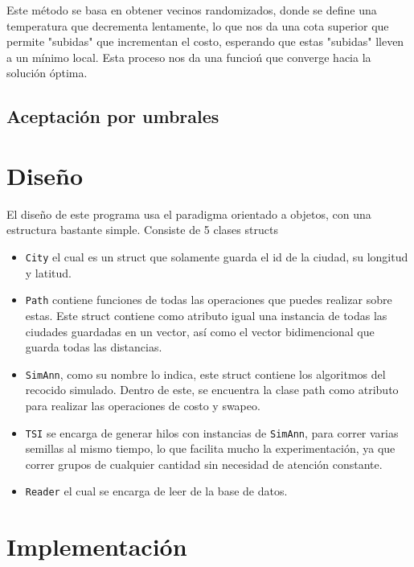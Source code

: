 \documentclass[a4paper]{article}
\begin{document}
Este m\'etodo se basa en obtener vecinos randomizados, donde se define una temperatura que decrementa lentamente, lo que nos da una cota superior que permite "subidas" que incrementan el costo, esperando que estas "subidas" lleven a un m\'inimo local. Esta proceso nos da una funcio\'
n que converge hacia la soluci\'on \'optima.

\subsection*{Aceptaci\'on por umbrales}

\section*{Diseño}
El diseño de este programa usa el paradigma orientado a objetos, con una estructura bastante simple. Consiste de 5 clases structs
\begin{itemize}
  \item \texttt{City} el cual es un struct que solamente guarda el id de la ciudad, su longitud y latitud.
\item  \texttt{Path} contiene funciones de todas las operaciones que puedes realizar sobre estas. Este struct contiene como atributo igual una instancia de todas las ciudades guardadas en un vector, as\'i como el vector bidimencional que guarda todas las distancias. 
  \item \texttt{SimAnn}, como su nombre lo indica, este struct contiene los algoritmos del recocido simulado. Dentro de este, se encuentra la clase path como atributo para realizar las operaciones de costo y swapeo.
\item \texttt{TSI} se encarga de generar hilos con instancias de \texttt{SimAnn}, para correr varias semillas al mismo tiempo, lo que facilita mucho la experimentaci\'on, ya que correr grupos de cualquier cantidad sin necesidad de atenci\'on constante.
\item \texttt{Reader} el cual se encarga de leer de la base de datos.
\end{itemize}


\section*{Implementaci\'on}
\end{document}
